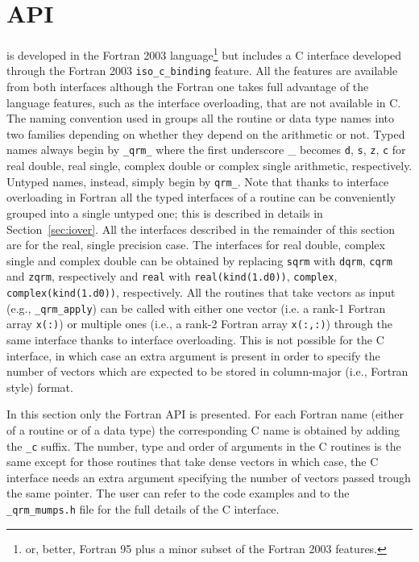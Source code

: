 \documentclass[11pt]{article}
\begin{document}

\newpage
\section{API}
\qrm is developed in the Fortran 2003 language\footnote{or, better,
  Fortran 95 plus a minor subset of the Fortran 2003 features.} but
includes a C interface developed through the Fortran 2003
\texttt{iso\_c\_binding} feature. All the \qrm features are available
from both interfaces although the Fortran one takes full advantage of
the language features, such as the interface overloading, that are
not available in C.  The naming convention used in \qrm groups all the
routine or data type names into two families depending on whether they
depend on the arithmetic or not. Typed names always begin by
\texttt{\_qrm\_} where the first underscore \_ becomes \texttt{d},
\texttt{s}, \texttt{z}, \texttt{c} for real double, real single,
complex double or complex single arithmetic, respectively. Untyped
names, instead, simply begin by \texttt{qrm\_}. Note that thanks to
interface overloading in Fortran all the typed interfaces of a routine
can be conveniently grouped into a single untyped one; this is
described in details in Section~\ref{sec:iover}.  All the interfaces
described in the remainder of this section are for the real, single
precision case. The interfaces for real double, complex single and
complex double can be obtained by replacing \texttt{sqrm} with
\texttt{dqrm}, \texttt{cqrm} and \texttt{zqrm}, respectively and
\texttt{real} with \texttt{real(kind(1.d0))}, \texttt{complex},
\texttt{complex(kind(1.d0))}, respectively. All the routines that take
vectors as input (e.g., \texttt{\_qrm\_apply}) can be called with
either one vector (i.e. a rank-1 Fortran array \texttt{x(:)}) or
multiple ones (i.e., a rank-2 Fortran array \texttt{x(:,:)}) through
the same interface thanks to interface overloading. This is not
possible for the C interface, in which case an extra argument is
present in order to specify the number of vectors which are expected
to be stored in column-major (i.e., Fortran style) format.

In this section only the Fortran API is presented. For each Fortran
name (either of a routine or of a data type) the corresponding C name
is obtained by adding the \texttt{\_c} suffix. The number, type and
order of arguments in the C routines is the same except for those
routines that take dense vectors in which case, the C interface needs
an extra argument specifying the number of vectors passed trough the
same pointer. The user can refer to the code examples and to the
\texttt{\_qrm\_mumps.h} file for the full details of the C interface.
\end{document}
